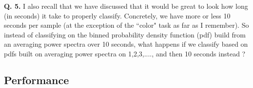 \begin{figure}
\begin{center}
\caption{ }
\label{ }
\end{center}
\end{figure}


{\bf Q. 5.} I also recall that we have discussed that it would be great to look how long (in seconds) it take to properly classify. Concretely, we have more or less 10 seconds per sample (at the exception of the ``color" task as far as I remember). So instead of classifying on the binned probability density function (pdf) build from an averaging power spectra over 10 seconds, what happens if we classify based on pdfs built on averaging power spectra on 1,2,3,...., and then 10 seconds instead ?




\subsection{Performance}



